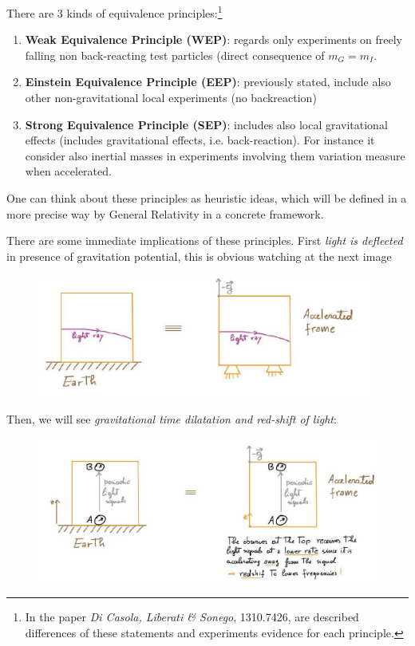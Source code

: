 \documentclass[../main/main.tex]{subfiles}
\begin{document}
There are 3 kinds of equivalence principles:\footnote{In the paper \emph{Di Casola, Liberati \& Sonego}, 1310.7426, are described differences of these statements and experiments evidence for each principle.}
\begin{enumerate}
\item\textbf{Weak Equivalence Principle (WEP)}: regards only experiments on freely falling non back-reacting test particles (direct consequence of $m_G=m_I$.
\item\textbf{Einstein Equivalence Principle (EEP)}: previously stated, include also other non-gravitational local experiments (no backreaction)
\item\textbf{Strong Equivalence Principle (SEP)}: includes also local gravitational effects (includes gravitational effects, i.e. back-reaction). For instance it consider also inertial masses in experiments involving them variation measure when accelerated. 
\end{enumerate}

One can think about these principles as heuristic ideas, which will be defined in a more precise way by General Relativity in a concrete framework. 


There are some immediate implications of these principles. First \emph{light is deflected} in presence of gravitation potential, this is obvious watching at the next image


\begin{figure}[H]
\centering
\includegraphics[width=11cm]{../img/light-deflection.jpg}
\end{figure}

Then, we will see \emph{gravitational time dilatation and red-shift of light}:

\begin{figure}[H]
\centering
\includegraphics[width=11.5cm]{../img/redshift.jpg}
\end{figure}
\end{document}
